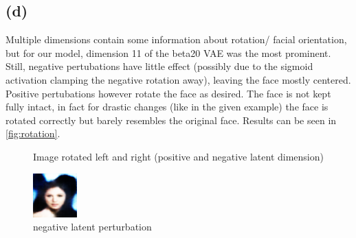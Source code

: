\documentclass[11pt]{article}
\numberwithin{equation}{section}
\begin{document}
\newpage
\subsection{(d)}

Multiple dimensions contain some information about rotation/ facial orientation,
but for our model, dimension 11 of the beta20 VAE was the most prominent. Still,
negative pertubations have little effect (possibly due to the sigmoid activation clamping the negative rotation away),
leaving the face mostly centered. Positive pertubations however rotate the face as
desired.
The face is not kept fully intact, in fact for drastic changes (like in the given example) the face is rotated correctly but barely resembles the original face.
Results can be seen in \ref{fig:rotation}.


\begin{figure}[h]
  \caption{Image rotated left and right (positive and negative latent dimension) }
  \label{fig:rotation}
  \label{fig:variation}
    \centering
    \begin{minipage}{0.4\textwidth}
        \includegraphics[width=\textwidth]{ex02/beta20.0-rotated_left.png}
        \caption{negative latent perturbation}
    \end{minipage}
    \hspace{2cm}
    \begin{minipage}{0.4\textwidth}

\end{minipage}
\end{figure}
\end{document}
